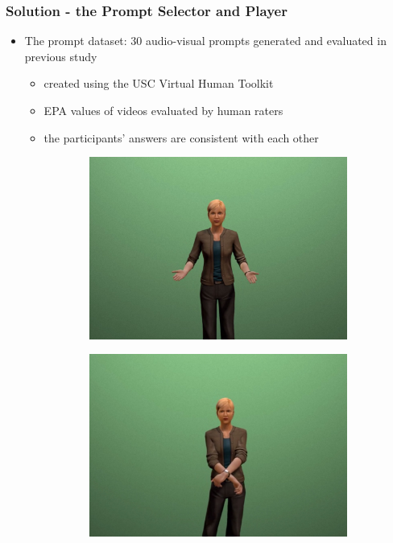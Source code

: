 \documentclass{beamer}
\begin{document}
\begin{frame}
\frametitle{Solution - the Prompt Selector and Player}
\begin{itemize}
\item The prompt dataset: 30 audio-visual prompts generated and evaluated in previous study
\begin{itemize}
\item created using the USC Virtual Human Toolkit
\item EPA values of videos evaluated by human raters
\item the participants' answers are consistent with each other
\end{itemize}
\begin{figure}[htb]
\centering
\begin{subfigure}[b]{.4\textwidth}
\includegraphics[width=\textwidth]{fig/prompt1.jpg}
\end{subfigure}
\begin{subfigure}[b]{.4\textwidth}
\includegraphics[width=\textwidth]{fig/prompt2.jpg}

\end{subfigure}
\end{figure}
\end{itemize}
\end{frame}
\end{document}
